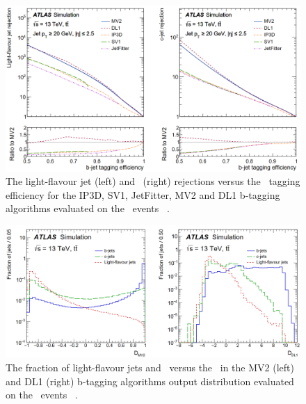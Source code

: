 \documentclass[letterpaper,12pt]{article}
\begin{document}
\begin{figure}[!h]
	\includegraphics[width=1\textwidth]{FTAG_plots/b-tagging-perfermance.png}
	\caption{The light-flavour jet (left) and \cjet\ (right) rejections versus 
	the \bjet\ tagging efficiency for the IP3D, SV1, JetFitter, MV2 and
	DL1 b-tagging algorithms evaluated on the \ttbar\ events
	~\cite{FTAG-2018-01}.}\label{fig:b-tagging-performance}
\end{figure}


\begin{figure}[!h]
	\includegraphics[width=1\textwidth]{FTAG_plots/b-tagging-score.png}
	\caption{The fraction of light-flavour jets and \cjets\ versus 
	the \bjets\ in the MV2 (left) and
	DL1 (right) b-tagging algorithms output distribution 
	evaluated on the \ttbar\ events
	~\cite{FTAG-2018-01}.}\label{fig:b-tagging-score}
\end{figure}


\end{document}
